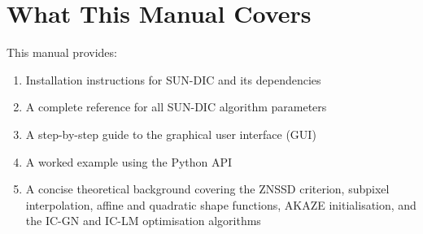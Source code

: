\section{What This Manual Covers}

This manual provides:

\begin{enumerate}
	\item Installation instructions for SUN-DIC and its dependencies
	\item A complete reference for all SUN-DIC algorithm parameters
	\item A step-by-step guide to the graphical user interface (GUI)
	\item A worked example using the Python API
	\item A concise theoretical background covering the ZNSSD criterion, subpixel interpolation, affine and quadratic shape functions, AKAZE initialisation, and the IC-GN and IC-LM optimisation algorithms
\end{enumerate}
